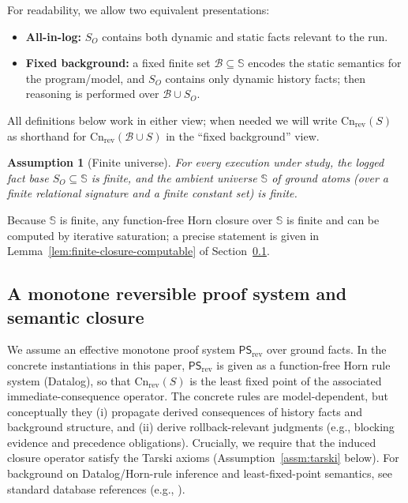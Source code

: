 \documentclass[twoside]{article}
\newtheorem{assumption}[theorem]{Assumption}
\newcommand{\Cn}{\mathrm{Cn}}
\newcommand{\1}{\mathbf{1}}
\begin{document}
For readability, we allow two equivalent presentations:
\begin{itemize}
  \item \textbf{All-in-log:} \(S_O\) contains both dynamic and static facts relevant to the run.
  \item \textbf{Fixed background:} a fixed finite set \(\mathcal{B}\subseteq\mathbb{S}\) encodes the static semantics for the program/model,
        and \(S_O\) contains only dynamic history facts; then reasoning is performed over \(\mathcal{B}\cup S_O\).
\end{itemize}
All definitions below work in either view; when needed we will write \(\Cn_{\mathrm{rev}}(S)\) as shorthand for
\(\Cn_{\mathrm{rev}}(\mathcal{B}\cup S)\) in the ``fixed background'' view.

\begin{assumption}[Finite universe]
\label{assm:finiteness}
For every execution under study, the logged fact base \(S_O\subseteq\mathbb{S}\) is finite, and the ambient universe
\(\mathbb{S}\) of ground atoms (over a finite relational signature and a finite constant set) is finite.
\end{assumption}

Because \(\mathbb{S}\) is finite, any function-free Horn closure over \(\mathbb{S}\) is finite and can be computed by iterative
saturation; a precise statement is given in Lemma~\ref{lem:finite-closure-computable} of Section~\ref{sec:closure}.

\subsection{A monotone reversible proof system and semantic closure}
\label{sec:closure}

We assume an effective monotone proof system \(\mathsf{PS}_{\mathrm{rev}}\) over ground facts.
In the concrete instantiations in this paper, \(\mathsf{PS}_{\mathrm{rev}}\) is given as a function-free Horn rule system (Datalog),
so that \(\Cn_{\mathrm{rev}}(S)\) is the least fixed point of the associated immediate-consequence operator.
The concrete rules are model-dependent, but conceptually they (i) propagate derived consequences of history facts and background structure,
and (ii) derive rollback-relevant judgments (e.g., blocking evidence and precedence obligations).
Crucially, we require that the induced closure operator satisfy the Tarski axioms (Assumption~\ref{assm:tarski} below).
For background on Datalog/Horn-rule inference and least-fixed-point semantics, see standard database references (e.g., \cite{abiteboul1995foundations}).
\end{document}
